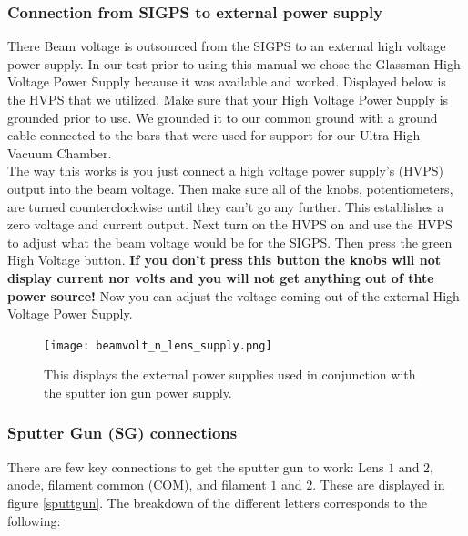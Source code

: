 \documentclass[11pt,a4paper]{report}
\begin{document}
\subsubsection{Connection from SIGPS to external power supply}
There Beam voltage is outsourced from the SIGPS to an external high voltage power supply. In our test prior to using this manual we chose the Glassman High Voltage Power Supply because it was available and worked. Displayed below is the HVPS that we utilized. Make sure that your High Voltage Power Supply is grounded prior to use. We grounded it to our common ground with a ground cable connected to the bars that were used for support for our Ultra High Vacuum Chamber.
\\
The way this works is you just connect a high voltage power supply's (HVPS)  output into the beam voltage. Then make sure all of the knobs, potentiometers, are turned counterclockwise until they can't go any further. This establishes a zero voltage and current output. Next turn on the HVPS on and use the HVPS to adjust what the beam voltage would be for the SIGPS. Then press the green High Voltage button. {\bf If you don't press this button the knobs will not display current nor volts and you will not get anything out of thte power source!} Now you can adjust the voltage coming out of the external High Voltage Power Supply.


\begin{figure}[H]
\texttt{[image: beamvolt\_n\_lens\_supply.png]}
\caption{This displays the external power supplies used in conjunction with the sputter ion gun power supply. }
\label{SIGPSa}
\end{figure}

\subsubsection{Sputter Gun (SG) connections }
There are few key connections to get the sputter gun to work: Lens $1$ and $2$, anode, filament common (COM), and filament $1$ and $2$. These are displayed in figure \ref{sputtgun}. The breakdown of the different letters corresponds to the following:
\end{document}
